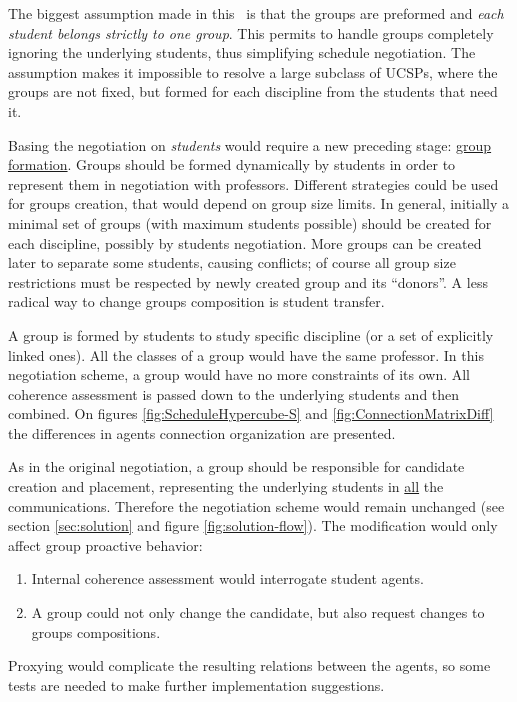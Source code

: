 \documentclass[ThesisDoc]{subfiles}
\begin{document}
The biggest assumption made in this \thisdoc\ is that the groups are preformed
and \emph{each student belongs strictly to one group}. This permits to handle
groups completely ignoring the underlying students, thus simplifying schedule
negotiation.
The assumption makes it impossible to resolve a large subclass of UCSPs, where
the groups are not fixed, but formed for each discipline from the students
that need it.

Basing the negotiation on \emph{students} would require a new preceding stage:
\underline{group formation}. Groups should be formed dynamically by students in
order to represent them in negotiation with professors. Different strategies
could be used for groups creation, that would depend on group size limits.
In general, initially a minimal set of groups (with maximum students possible)
should be created for each discipline, possibly by students negotiation.
More groups can be created later to separate some students, causing conflicts;
of course all group size restrictions must be respected by newly created
group and its ``donors''. A less radical way to change groups composition is
student transfer.

A group is formed by students to study specific discipline (or a set of
explicitly linked ones). All the classes of a group would have the same professor.
In this negotiation scheme, a group would have no more constraints of its own.
All coherence assessment is passed down to the underlying students and then
combined. On figures \ref{fig:ScheduleHypercube-S} and
\ref{fig:ConnectionMatrixDiff} the differences in agents connection organization
are presented.

As in the original negotiation, a group should be responsible for candidate
creation and placement, representing the underlying students in \underline{all}
the communications. Therefore the negotiation scheme would remain unchanged
(see section \ref{sec:solution} and figure \ref{fig:solution-flow}).
The modification would only affect group proactive behavior:
\begin{enumerate}
  \item Internal coherence assessment would interrogate student agents.
  \item A group could not only change the candidate, but also request changes
        to groups compositions.
\end{enumerate}

\medskip\noindent
Proxying would complicate the resulting relations between the agents, so
some tests are needed to make further implementation suggestions.
\end{document}
